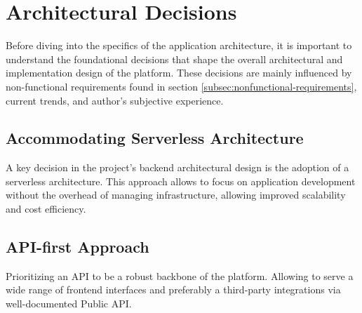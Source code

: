 




\section{Architectural Decisions}
\label{sec:architectural-decisions}
Before diving into the specifics of the application architecture, it is important to understand the foundational decisions that shape the overall architectural and implementation design of the platform.
These decisions are mainly influenced by non-functional requirements found in section \ref{subsec:nonfunctional-requirements}, current trends, and author's subjective experience.

\subsection{Accommodating Serverless Architecture}
A key decision in the project's backend architectural design is the adoption of a serverless architecture.
This approach allows to focus on application development without the overhead of managing infrastructure, allowing improved scalability and cost efficiency.


\subsection{API-first Approach}
Prioritizing an API to be a robust backbone of the platform.
Allowing to serve a wide range of frontend interfaces and preferably a third-party integrations via well-documented Public API.


